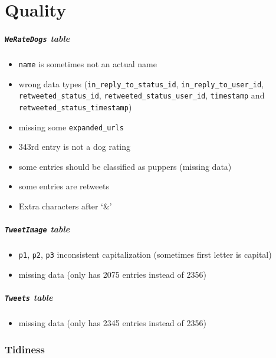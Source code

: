 \documentclass[11pt]{article}
\providecommand{\tightlist}{%
      \setlength{\itemsep}{0pt}\setlength{\parskip}{0pt}}
\begin{document}
    \hypertarget{quality}{%
\section{Quality}\label{quality}}

\hypertarget{weratedogs-table}{%
\subparagraph{\texorpdfstring{\texttt{WeRateDogs}
table}{WeRateDogs table}}\label{weratedogs-table}}

\begin{itemize}
\tightlist
\item
  \texttt{name} is sometimes not an actual name
\item
  wrong data types (\texttt{in\_reply\_to\_status\_id},
  \texttt{in\_reply\_to\_user\_id}, \texttt{retweeted\_status\_id},
  \texttt{retweeted\_status\_user\_id}, \texttt{timestamp} and
  \texttt{retweeted\_status\_timestamp})
\item
  missing some \texttt{expanded\_urls}
\item
  343rd entry is not a dog rating
\item
  some entries should be classified as puppers (missing data)
\item
  some entries are retweets
\item
  Extra characters after `\&'
\end{itemize}

\hypertarget{tweetimage-table}{%
\subparagraph{\texorpdfstring{\texttt{TweetImage}
table}{TweetImage table}}\label{tweetimage-table}}

\begin{itemize}
\tightlist
\item
  \texttt{p1}, \texttt{p2}, \texttt{p3} inconsistent capitalization
  (sometimes first letter is capital)
\item
  missing data (only has 2075 entries instead of 2356)
\end{itemize}

\hypertarget{tweets-table}{%
\subparagraph{\texorpdfstring{\texttt{Tweets}
table}{Tweets table}}\label{tweets-table}}

\begin{itemize}
\tightlist
\item
  missing data (only has 2345 entries instead of 2356)
\end{itemize}

    \hypertarget{tidiness}{%
\subsubsection{Tidiness}\label{tidiness}}
\end{document}

